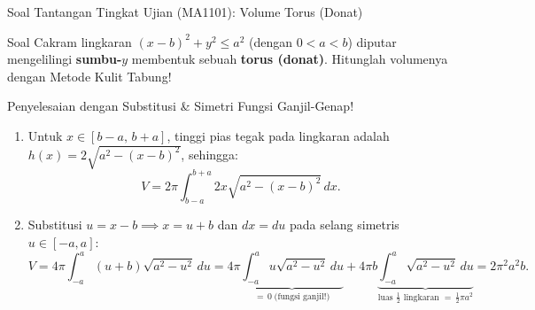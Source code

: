 \documentclass[aspectratio=43,10pt]{beamer}
\begin{document}
\begin{frame}{Soal Tantangan Tingkat Ujian (MA1101): Volume Torus (Donat)}
    \begin{exampleblock}{Soal}
        \scriptsize
        Cakram lingkaran $(x - b)^2 + y^2 \le a^2$ (dengan $0 < a < b$) diputar mengelilingi \textbf{sumbu-$y$} membentuk sebuah \textbf{torus (donat)}. Hitunglah volumenya dengan Metode Kulit Tabung!
    \end{exampleblock}

    \begin{block}{Penyelesaian dengan Substitusi \& Simetri Fungsi Ganjil-Genap!}
        \scriptsize\abovedisplayskip=2pt\belowdisplayskip=2pt
        \begin{enumerate}\itemsep=2pt
            \item Untuk $x \in [b - a, \,b + a]$, tinggi pias tegak pada lingkaran adalah $h(x) = 2\sqrt{a^2 - (x - b)^2}$, sehingga:
            $$V = 2\pi\int_{b-a}^{b+a} 2x\sqrt{a^2 - (x - b)^2}\,dx.$$
            \item Substitusi $u = x - b \implies x = u + b$ dan $dx = du$ pada selang simetris $u \in [-a, a]$:
            $$V = 4\pi\int_{-a}^{a} (u + b)\sqrt{a^2 - u^2}\,du = 4\pi\underbrace{\int_{-a}^{a} u\sqrt{a^2 - u^2}\,du}_{=\,0\;\text{(fungsi ganjil!)}} + 4\pi b\underbrace{\int_{-a}^{a} \sqrt{a^2 - u^2}\,du}_{\text{luas }\frac{1}{2}\text{ lingkaran }=\,\frac{1}{2}\pi a^2} = \boxed{2\pi^2 a^2 b}.$$
        \end{enumerate}
    \end{block}
\end{frame}
\end{document}
